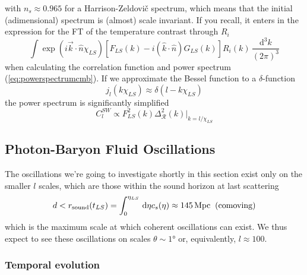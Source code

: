 with $n_{s} \approx 0.965$ for a Harrison-Zeldovič spectrum, which means that the initial (adimensional) spectrum is (almost) scale invariant. If you recall, it enters in the expression for the FT of the temperature contrast through $R_{i}$ 
\begin{equation}
    \int \exp\left(i\vec{k}\cdot\hat{n}\chi_{LS}\right)\left[F_{LS}(k)-i(\hat{k}\cdot\hat{n})G_{LS}(k)\right]R_{i}(k)\,\frac{\text{d}^{3}k}{(2\pi)^{3}}
\end{equation}
when calculating the correlation function and power spectrum (\ref{eq:powerspectrumcmb}). If we approximate the Bessel function to a $\delta$-function 
\begin{equation}
    j_{l}(k\chi_{LS}) \approx \delta(l-k\chi_{LS})
\end{equation}
the power spectrum is significantly simplified 
\begin{equation}
    C_{l}^{SW} \propto F_{LS}^{2}(k)\Delta_{\mathcal{R}}^{2}(k)|_{k = l/\chi_{LS}}
\end{equation}

\subsection{Photon-Baryon Fluid Oscillations}

 The oscillations we're going to investigate shortly in this section exist only on the smaller $l$ scales, which are those within the sound horizon at last scattering 
\begin{equation}
    d < r_{\text{sound}}(t_{LS}) = \int_{0}^{\eta_{LS}} \,\text{d}\eta c_{s}(\eta) \approx 145\,\text{Mpc} \;\;(\text{comoving})
\end{equation}
which is the maximum scale at which coherent oscillations can exist. We thus expect to see these oscillations on scales $\theta \sim 1$° or, equivalently, $l \approx 100$.

\subsubsection{Temporal evolution}

